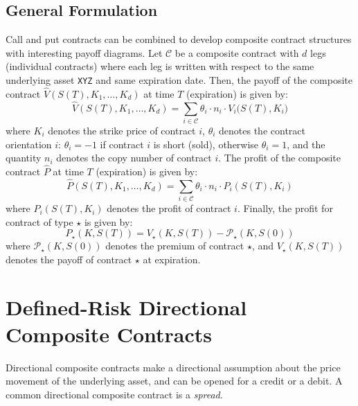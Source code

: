 \documentclass[11pt]{article}
\theoremstyle{definition}
\begin{document}
\subsection*{General Formulation}
Call and put contracts can be combined to develop composite contract structures with interesting payoff diagrams. 
Let $\mathcal{C}$ be a composite contract with $d$ legs (individual contracts) where each leg is written
with respect to the same underlying asset \texttt{XYZ} and same expiration date. 
Then, the payoff of the composite contract $\hat{V}(S(T),K_{1},\dots,K_{d})$ at time $T$ (expiration) is given by:
\begin{equation}
\hat{V}(S(T),K_{1},\dots,K_{d}) = \sum_{i\in\mathcal{C}}\theta_{i}\cdot{n_{i}}\cdot{V_{i}(S(T),K_{i}})
\end{equation}
where $K_{i}$ denotes the strike price of contract $i$, $\theta_{i}$ denotes the contract orientation $i$: $\theta_{i}=-1$ if contract $i$ is short (sold), 
otherwise $\theta_{i}=1$, and the quantity $n_{i}$ denotes the copy number of contract $i$.
The profit of the composite contract $\hat{P}$ at time $T$ (expiration) is given by:
\begin{equation}
\hat{P}(S(T),K_{1},\dots,K_{d}) = \sum_{i\in\mathcal{C}}\theta_{i}\cdot{n}_{i}\cdot{P}_{i}(S(T),K_{i})
\end{equation}
where $P_{i}(S(T),K_{i})$ denotes the profit of contract $i$. 
Finally, the profit for contract of type $\star$ is given by:
\begin{equation}
P_{\star}(K,S(T)) = {V}_{\star}(K,S(T)) -  \mathcal{P}_{\star}(K,S(0))
\end{equation}
where $\mathcal{P}_{\star}(K,S(0))$ denotes the premium of contract $\star$, and ${V}_{\star}(K,S(T))$ 
denotes the payoff of contract $\star$ at expiration.

\section*{Defined-Risk Directional Composite Contracts}
Directional composite contracts make a directional assumption about the price movement of the underlying asset, and can be opened for a credit or a debit.
A common directional composite contract is a \textit{spread}.
\end{document}
